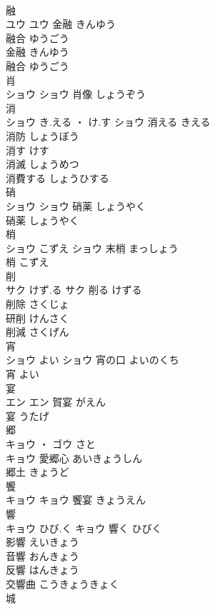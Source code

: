 \documentclass[8pt]{extreport}
\begin{document}
\begin{CJK}{UTF8}{min}
\\	融	
\\	ユウ		ユウ	金融	きんゆう	
\\	融合	ゆうごう	
\\	金融	きんゆう	
\\	融合	ゆうごう	
\\	肖	
\\	ショウ		ショウ													肖像	しょうぞう	
\\	消	
\\	ショウ	き.える ・ け.す	ショウ	消える	きえる	
\\	消防	しょうぼう	
\\	消す	けす	
\\	消滅	しょうめつ	
\\	消費する	しょうひする	
\\	硝	
\\	ショウ		ショウ	硝薬	しょうやく	
\\	硝薬	しょうやく	
\\	梢	
\\	ショウ	こずえ	ショウ													末梢	まっしょう	
\\	梢	こずえ	
\\	削	
\\	サク	けず.る	サク	削る	けずる	
\\	削除	さくじょ	
\\	研削	けんさく	
\\	削減	さくげん	
\\	宵	
\\	ショウ	よい	ショウ	宵の口	よいのくち	
\\	宵	よい	
\\	宴	
\\	エン		エン													賀宴	がえん	
\\	宴	うたげ	
\\	郷	
\\	キョウ ・ ゴウ	さと
\\	キョウ													愛郷心	あいきょうしん	
\\	郷土	きょうど	
\\	饗	
\\	キョウ		キョウ													饗宴	きょうえん	
\\	響	
\\	キョウ	ひび.く	キョウ	響く	ひびく	
\\	影響	えいきょう	
\\	音響	おんきょう	
\\	反響	はんきょう	
\\	交響曲	こうきょうきょく	
\\	城	

\end{CJK}
\end{document}
